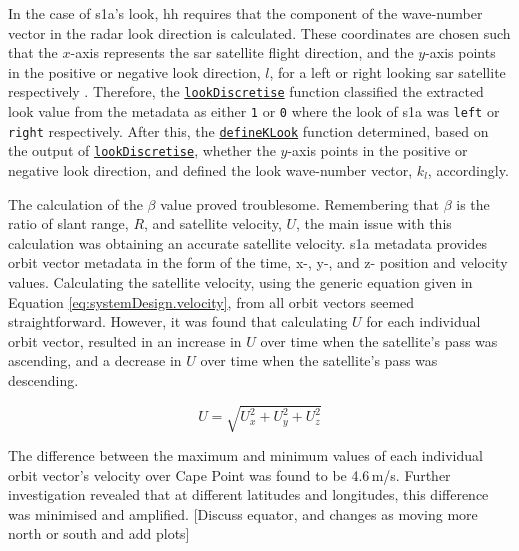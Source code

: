 In the case of \acs{s1a}'s look, \acs{hh} requires that the component of the wave-number vector in the radar look direction is calculated. These coordinates are chosen such that the $x$-axis represents the \acs{sar} satellite flight direction, and the $y$-axis points in the positive or negative look direction, $l$, for a left or right looking \acs{sar} satellite respectively \cite{Hasselmann1991}. Therefore, the \href{https://github.com/JNSRYA006/sar-parameter-extraction-pipeline/blob/main/functions/hasselmann/helperFunctions.m}{\lstinline{lookDiscretise}} function classified the extracted look value from the metadata as either \texttt{1} or \texttt{0} where the look of \acs{s1a} was \texttt{left} or \texttt{right} respectively. After this, the \href{https://github.com/JNSRYA006/sar-parameter-extraction-pipeline/blob/main/functions/hasselmann/helperFunctions.m}{\lstinline{defineKLook}} function determined, based on the output of \href{https://github.com/JNSRYA006/sar-parameter-extraction-pipeline/blob/main/functions/hasselmann/helperFunctions.m}{\lstinline{lookDiscretise}}, whether the $y$-axis points in the positive or negative look direction, and defined the look wave-number vector, $k_{l}$, accordingly.

The calculation of the $\beta$ value proved troublesome. Remembering that $\beta$ is the ratio of slant range, $R$, and satellite velocity, $U$, the main issue with this calculation was obtaining an accurate satellite velocity. \acs{s1a} metadata provides orbit vector metadata in the form of the time, x-, y-, and z- position and velocity values. Calculating the satellite velocity, using the generic equation given in Equation \ref{eq:systemDesign.velocity}, from all orbit vectors seemed straightforward. However, it was found that calculating $U$ for each individual orbit vector, resulted in an increase in $U$ over time when the satellite's pass was ascending, and a decrease in $U$ over time when the satellite's pass was descending. 

\begin{equation} \label{eq:systemDesign.velocity}
    U = \sqrt{U_{x}^2 + U_{y}^2 + U_{z}^2}
\end{equation}

The difference between the maximum and minimum values of each individual orbit vector's velocity over Cape Point was found to be 4.6\,m/s. Further investigation revealed that at different latitudes and longitudes, this difference was minimised and amplified. [Discuss equator, and changes as moving more north or south and add plots]


